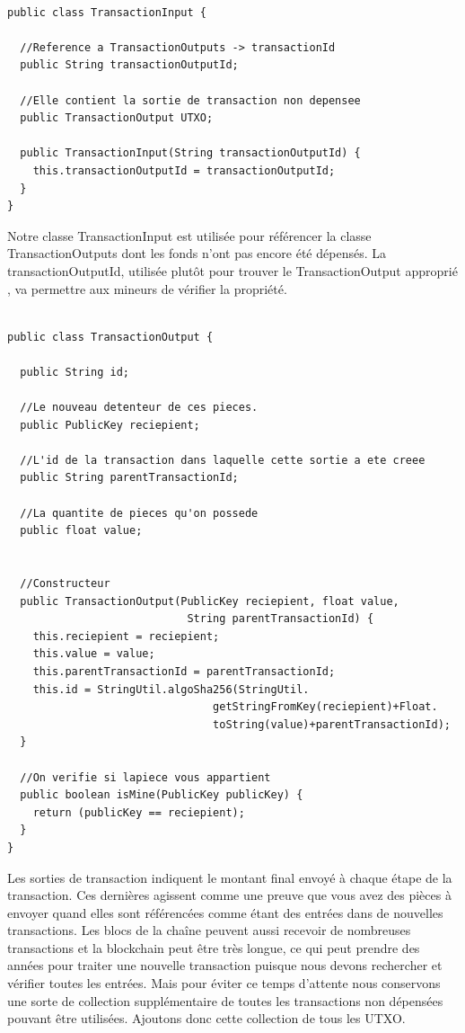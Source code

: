 \documentclass[12pt]{report}
\begin{document}
\begin{lstlisting}

public class TransactionInput {

  //Reference a TransactionOutputs -> transactionId
  public String transactionOutputId; 
  
  //Elle contient la sortie de transaction non depensee
  public TransactionOutput UTXO;
	
  public TransactionInput(String transactionOutputId) {
    this.transactionOutputId = transactionOutputId;
  }
}
\end{lstlisting}

\hspace{1cm} Notre classe TransactionInput est utilisée pour référencer la classe TransactionOutputs dont les fonds n'ont pas encore été dépensés. La transactionOutputId, utilisée plutôt pour trouver le TransactionOutput approprié , va permettre aux mineurs de vérifier la propriété.

\begin{lstlisting}

public class TransactionOutput {

  public String id;
  
  //Le nouveau detenteur de ces pieces.
  public PublicKey reciepient; 
  
  //L'id de la transaction dans laquelle cette sortie a ete creee
  public String parentTransactionId; 
  
  //La quantite de pieces qu'on possede
  public float value; 
  
	
  //Constructeur
  public TransactionOutput(PublicKey reciepient, float value, 
                            String parentTransactionId) {
    this.reciepient = reciepient;
    this.value = value;
    this.parentTransactionId = parentTransactionId;
    this.id = StringUtil.algoSha256(StringUtil.
                                getStringFromKey(reciepient)+Float.
                                toString(value)+parentTransactionId);
  }
	
  //On verifie si lapiece vous appartient
  public boolean isMine(PublicKey publicKey) {
    return (publicKey == reciepient);
  }
}
\end{lstlisting}

\hspace{1cm} Les sorties de transaction indiquent le montant final envoyé à chaque étape de la transaction. Ces dernières agissent comme une preuve que vous avez des pièces à envoyer quand elles sont référencées comme étant des entrées dans de nouvelles transactions. Les blocs de la chaîne peuvent aussi recevoir de nombreuses transactions et la blockchain peut être très longue, ce qui peut prendre des années pour traiter une nouvelle transaction puisque nous devons rechercher et vérifier toutes les entrées. Mais pour éviter ce temps d'attente nous conservons une sorte de collection supplémentaire de toutes les transactions non dépensées pouvant être utilisées. Ajoutons donc cette collection de tous les UTXO.
\end{document}
